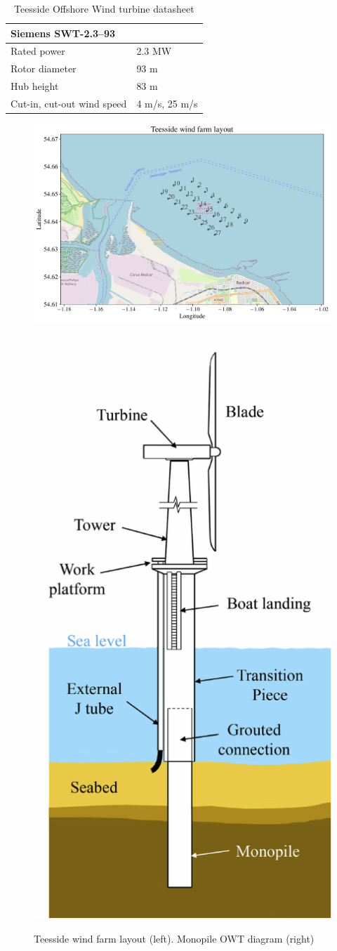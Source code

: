 \begin{table}[h]
    \centering
    \caption{Teesside Offshore Wind turbine datasheet}
    \begin{tabular}{ll}
     \hline
     \multicolumn{2}{l}{Siemens SWT-2.3–93} \\ \hline
        Rated power & 2.3 MW\\
        Rotor diameter & 93 m\\
        Hub height & 83 m\\
        Cut-in, cut-out wind speed & 4 m/s, 25 m/s\\\hline
    \end{tabular}
    \label{tab:owt_datasheet}
\end{table}

\begin{figure}[h!]
\begin{center}
    \includegraphics[width=0.6\linewidth]{part2/figures/DCE/teesside/map_teesside_layout.pdf}
    \includegraphics[width=0.25\linewidth]{part2/figures/DCE/teesside/owt_diagram.pdf}
\end{center}
\caption{Teesside wind farm layout (left). Monopile OWT diagram \citep{Chen_2018_owt_diagram} (right)}
\label{fig:teesside_layout}
\end{figure}

